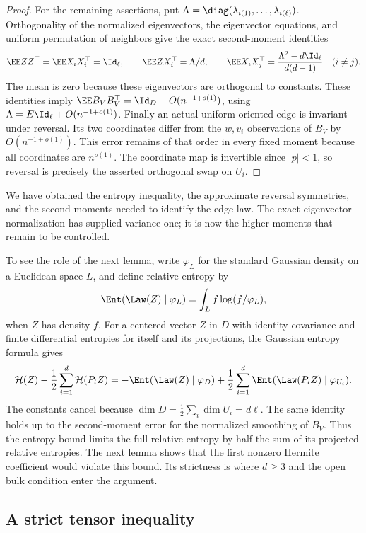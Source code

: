 \begin{proof}
For the remaining assertions, put
\(\Lambda=\diag(\lambda_{i(1)},\ldots,\lambda_{i(\ell)})\).
Orthogonality of the normalized eigenvectors, the eigenvector
equations, and uniform permutation of neighbors give the exact
second-moment identities
\[
 \EE ZZ^\top=\EE X_iX_i^\top=\Id_\ell,\qquad
 \EE ZX_i^\top=\Lambda/d,\qquad
 \EE X_iX_j^\top=\frac{\Lambda^2-d\Id_\ell}{d(d-1)}
 \quad(i\ne j).
\]
The mean is zero because these eigenvectors are orthogonal to
constants. These identities imply
\(\EE B_VB_V^\top=\Id_D+O(n^{-1+o(1)})\), using
\(\Lambda=E\Id_\ell+O(n^{-1+o(1)})\).
Finally an actual uniform oriented edge is invariant under reversal.
Its two coordinates differ from the \(w,v_i\) observations of \(B_V\)
by \(O(n^{-1+o(1)})\). This error remains of that order in every
fixed moment because all coordinates are \(n^{o(1)}\).
The coordinate map is invertible since \(|p|<1\), so reversal
is precisely the asserted orthogonal swap on \(U_i\).
\end{proof}

We have obtained the entropy inequality, the approximate reversal
symmetries, and the second moments needed to identify the edge law.
The exact eigenvector normalization has supplied variance one; it is
now the higher moments that remain to be controlled.

To see the role of the next lemma, write
\(\varphi_L\) for the standard Gaussian density on a Euclidean space
\(L\), and define relative entropy by
\[
 \Ent(\Law(Z)\mid\varphi_L)
 =\int_L f\log(f/\varphi_L),
\]
when \(Z\) has density \(f\). For a centered vector \(Z\) in \(D\)
with identity covariance and finite differential entropies for itself
and its projections, the Gaussian entropy formula gives
\begin{equation}\label{eq:ent-deficit-sign}
 \mathcal H(Z)-\frac12\sum_{i=1}^d\mathcal H(P_iZ)
 =-\Ent(\Law(Z)\mid\varphi_D)
   +\frac12\sum_{i=1}^d
        \Ent(\Law(P_iZ)\mid\varphi_{U_i}).
\end{equation}
The constants cancel because
\(\dim D=\frac12\sum_i\dim U_i=d\ell\).
The same identity holds up to the second-moment error for the normalized
smoothing of \(B_V\). Thus the entropy bound limits the full relative
entropy by half the sum of its projected relative entropies.
The next lemma shows that the first nonzero Hermite coefficient would
violate this bound. Its strictness is where \(d\ge3\) and the open bulk
condition enter the argument.

\subsection{A strict tensor inequality}

